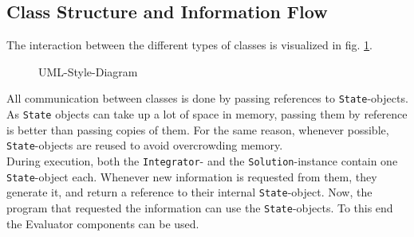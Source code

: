 \subsection{Class Structure and Information Flow}
The interaction between the different types of classes is visualized in fig. \ref{UML_diagram}.

\begin{figure}[!h]
    \caption{UML-Style-Diagram}
    \label{UML_diagram}
\end{figure}

All communication between classes is done by passing references to \texttt{State}-objects.
As \texttt{State} objects can take up a lot of space in memory, passing them by reference is better than passing copies of them.
For the same reason, whenever possible, \texttt{State}-objects are reused to avoid overcrowding memory.
\\
During execution, both the \texttt{Integrator}- and the \texttt{Solution}-instance contain one \texttt{State}-object each.
Whenever new information is requested from them, they generate it, and return a reference to their internal \texttt{State}-object.
Now, the program that requested the information can use the \texttt{State}-objects.
To this end the Evaluator components can be used.

